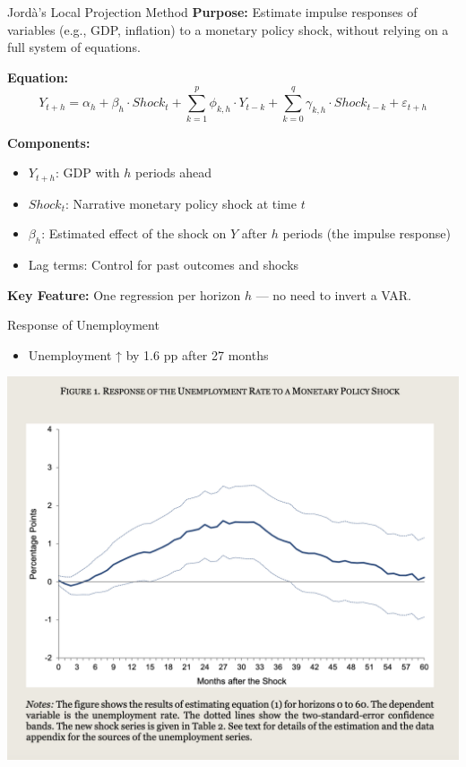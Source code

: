 \documentclass{beamer}
\begin{document}
\begin{frame}{Jordà’s Local Projection Method}
    \textbf{Purpose:} Estimate impulse responses of variables (e.g., GDP, inflation) to a monetary policy shock, without relying on a full system of equations.
  
    \vspace{1em}
    \textbf{Equation:}
    \[
      Y_{t+h} = \alpha_h + \beta_h \cdot Shock_t + \sum_{k=1}^{p} \phi_{k,h} \cdot Y_{t-k} + \sum_{k=0}^{q} \gamma_{k,h} \cdot Shock_{t-k} + \varepsilon_{t+h}
    \]

    \textbf{Components:}
    \begin{itemize}
      \item $Y_{t+h}$: GDP with $h$ periods ahead
      \item $Shock_t$: Narrative monetary policy shock at time $t$
      \item $\beta_h$: Estimated effect of the shock on $Y$ after $h$ periods (the impulse response)
      \item Lag terms: Control for past outcomes and shocks
    \end{itemize}
  
    \vspace{0.5em}
    \textbf{Key Feature:} One regression per horizon $h$ — no need to invert a VAR.
  
  \end{frame}

\begin{frame}{Response of Unemployment}
  \begin{itemize}
    \item Unemployment ↑ by 1.6 pp after 27 months
  \end{itemize}
  \centering
  \includegraphics[height=1\textheight]{Graphs/Unemployment Response.png}
\end{frame}
\end{document}
